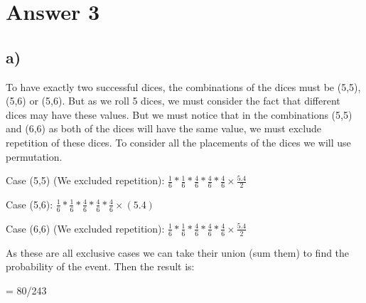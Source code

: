 \documentclass[12pt]{article}
\begin{document}
\section*{Answer 3}
\subsection*{a)}
To have exactly two successful dices, the combinations of the dices must be (5,5), (5,6) or (5,6). But as we roll 5 dices, we must consider the fact that different dices may have these values. But we must notice that in the combinations (5,5) and (6,6) as both of the dices will have the same value, we must exclude repetition of these dices. To consider all the placements of the dices we will use permutation.\\ \par 
Case (5,5) (We excluded repetition): $\frac{1}{6} \ast \frac{1}{6} \ast \frac{4}{6} \ast \frac{4}{6} \ast \frac{4}{6} \times \frac{5.4}{2}$ \\ \par
Case (5,6): $\frac{1}{6} \ast \frac{1}{6} \ast \frac{4}{6} \ast \frac{4}{6} \ast \frac{4}{6} \times (5.4)$\\ \par 
Case (6,6) (We excluded repetition): $\frac{1}{6} \ast \frac{1}{6} \ast \frac{4}{6} \ast \frac{4}{6} \ast \frac{4}{6} \times \frac{5.4}{2}$ \\ \par
As these are all exclusive cases we can take their union (sum them) to find the probability of the event. Then the result is: \\ \par 
= 80/243
\end{document}
